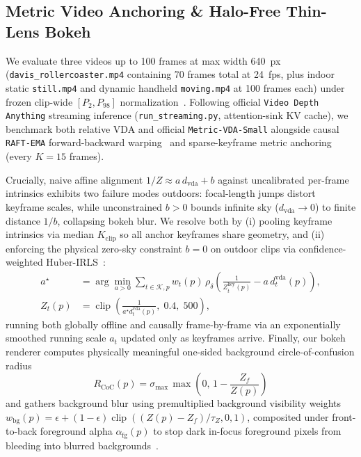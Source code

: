 \documentclass[10pt,twocolumn,letterpaper]{article}
\begin{document}
\subsection{Metric Video Anchoring \& Halo-Free Thin-Lens Bokeh}
We evaluate three videos up to 100 frames at max width 640~px (\texttt{davis\_rollercoaster.mp4} containing 70 frames total at 24~fps, plus indoor static \texttt{still.mp4} and dynamic handheld \texttt{moving.mp4} at 100 frames each) under frozen clip-wide $[P_2, P_{98}]$ normalization~\cite{ranftl2020midas,chen2025vda}. Following official \texttt{Video Depth Anything} streaming inference (\texttt{run\_streaming.py}, attention-sink KV cache), we benchmark both relative VDA and official \texttt{Metric-VDA-Small} alongside causal \texttt{RAFT-EMA} forward-backward warping~\cite{teed2020raft} and sparse-keyframe metric anchoring (every $K=15$ frames).

Crucially, naive affine alignment $1/Z \approx a\, d_{\text{vda}} + b$ against uncalibrated per-frame intrinsics exhibits two failure modes outdoors: focal-length jumps distort keyframe scales, while unconstrained $b>0$ bounds infinite sky ($d_{\text{vda}}\to 0$) to finite distance $1/b$, collapsing bokeh blur. We resolve both by (i) pooling keyframe intrinsics via median $K_{\mathrm{clip}}$ so all anchor keyframes share geometry, and (ii) enforcing the physical zero-sky constraint $b = 0$ on outdoor clips via confidence-weighted Huber-IRLS~\cite{huber1964robust}:
\begin{align}
  a^\star &= \arg\min_{a>0} \sum_{t\in\mathcal{K}, p} w_t(p)\, \rho_\delta\!\left(\frac{1}{Z_t^{\text{key}}(p)} - a\, d_t^{\text{vda}}(p)\right), \nonumber\\
  Z_t(p) &= \operatorname{clip}\!\left(\frac{1}{a^\star d_t^{\text{vda}}(p)},\; 0.4,\; 500\right),
  \label{eq:irls}
\end{align}
running both globally offline and causally frame-by-frame via an exponentially smoothed running scale $a_t$ updated only as keyframes arrive. Finally, our bokeh renderer computes physically meaningful one-sided background circle-of-confusion radius
\begin{equation}
  R_{\mathrm{CoC}}(p) = \sigma_{\max}\, \max\!\left(0,\, 1 - \frac{Z_f}{Z(p)}\right)
  \label{eq:coc}
\end{equation}
and gathers background blur using premultiplied background visibility weights $w_{\text{bg}}(p) = \epsilon + (1-\epsilon)\operatorname{clip}((Z(p)-Z_f)/\tau_Z, 0, 1)$, composited under front-to-back foreground alpha $\alpha_{\text{fg}}(p)$ to stop dark in-focus foreground pixels from bleeding into blurred backgrounds~\cite{peng2022bokehme,sheng2024drbokeh}.
\end{document}

